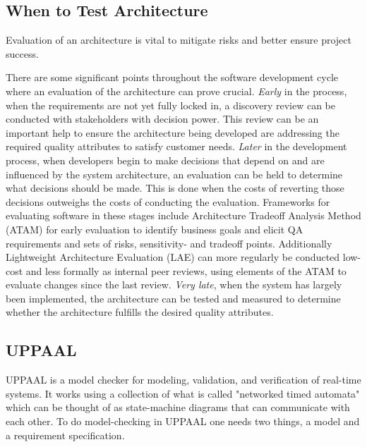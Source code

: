 


\subsection{When to Test Architecture} 
Evaluation of an architecture is vital to mitigate risks and better ensure project success.

There are some significant points throughout the software development cycle where an evaluation of the architecture can prove crucial. \textit{Early} in the process, when the requirements are not yet fully locked in, a discovery review can be conducted with stakeholders with decision power. This review can be an important help to ensure the architecture being developed are addressing the required quality attributes to satisfy customer needs. \textit{Later} in the development process, when developers begin to make decisions that depend on and are influenced by the system architecture, an evaluation can be held to determine what decisions should be made. This is done when the costs of reverting those decisions outweighs the costs of conducting the evaluation. 
Frameworks for evaluating software in these stages include Architecture Tradeoff Analysis Method (ATAM) for early evaluation to identify business goals and elicit QA requirements and sets of risks, sensitivity- and tradeoff points. Additionally Lightweight Architecture Evaluation (LAE) can more regularly be conducted low-cost and less formally as internal peer reviews, using elements of the ATAM to evaluate changes since the last review.
\textit{Very late}, when the system has largely been implemented, the architecture can be tested and measured to determine whether the architecture fulfills the desired quality attributes. \cite{WormKangLec72024}




\subsection{UPPAAL} 
UPPAAL is a model checker for modeling, validation, and verification of real-time systems. It works using a collection of what is called "networked timed automata" which can be thought of as state-machine diagrams that can communicate with each other. To do model-checking in UPPAAL one needs two things, a model and a requirement specification.
